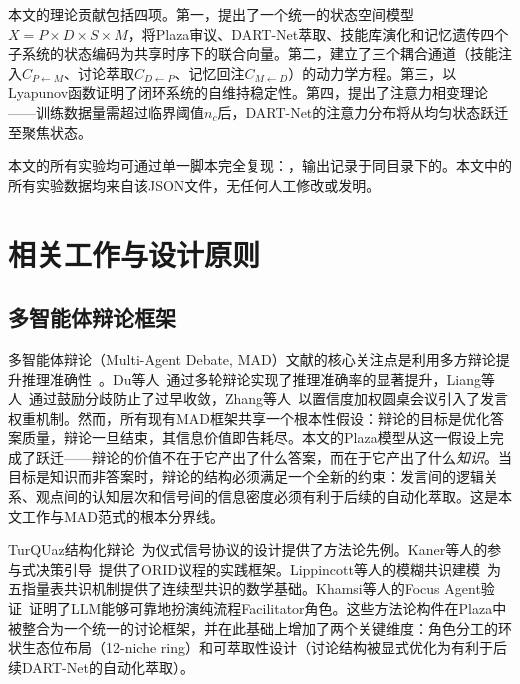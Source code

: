 \documentclass[12pt,a4paper]{ctexart}
\begin{document}
本文的理论贡献包括四项。第一，提出了一个统一的状态空间模型$X = P \times D \times S \times M$，将Plaza审议、DART-Net萃取、技能库演化和记忆遗传四个子系统的状态编码为共享时序下的联合向量。第二，建立了三个耦合通道（技能注入$C_{P\leftarrow M}$、讨论萃取$C_{D\leftarrow P}$、记忆回注$C_{M\leftarrow D}$）的动力学方程。第三，以Lyapunov函数证明了闭环系统的自维持稳定性。第四，提出了注意力相变理论——训练数据量需超过临界阈值$n_c$后，DART-Net的注意力分布将从均匀状态跃迁至聚焦状态。

本文的所有实验均可通过单一脚本完全复现：，输出记录于同目录下的。本文中的所有实验数据均来自该JSON文件，无任何人工修改或发明。

\section{相关工作与设计原则}

\subsection{多智能体辩论框架}

多智能体辩论（Multi-Agent Debate, MAD）文献的核心关注点是利用多方辩论提升推理准确性~\cite{du2023improving,liang2023encouraging,zhang2024reconcile,xiong2023dubi}。Du等人~\cite{du2023improving}通过多轮辩论实现了推理准确率的显著提升，Liang等人~\cite{liang2023encouraging}通过鼓励分歧防止了过早收敛，Zhang等人~\cite{zhang2024reconcile}以置信度加权圆桌会议引入了发言权重机制。然而，所有现有MAD框架共享一个根本性假设：辩论的目标是优化答案质量，辩论一旦结束，其信息价值即告耗尽。本文的Plaza模型从这一假设上完成了跃迁——辩论的价值不在于它产出了什么答案，而在于它产出了什么\emph{知识}。当目标是知识而非答案时，辩论的结构必须满足一个全新的约束：发言间的逻辑关系、观点间的认知层次和信号间的信息密度必须有利于后续的自动化萃取。这是本文工作与MAD范式的根本分界线。

TurQUaz结构化辩论~\cite{gungor2025turquaz}为仪式信号协议的设计提供了方法论先例。Kaner等人的参与式决策引导~\cite{kaner2014facilitator}提供了ORID议程的实践框架。Lippincott等人的模糊共识建模~\cite{lippincott2025fuzzy}为五指量表共识机制提供了连续型共识的数学基础。Khamsi等人的Focus Agent验证~\cite{khamsi2024focus}证明了LLM能够可靠地扮演纯流程Facilitator角色。这些方法论构件在Plaza中被整合为一个统一的讨论框架，并在此基础上增加了两个关键维度：角色分工的环状生态位布局（12-niche ring）和可萃取性设计（讨论结构被显式优化为有利于后续DART-Net的自动化萃取）。
\end{document}
